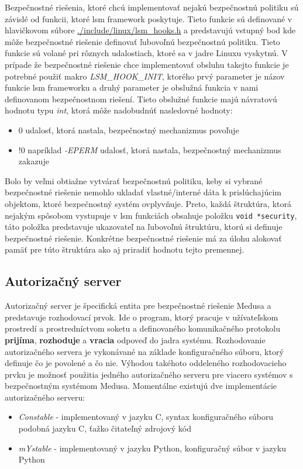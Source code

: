 Bezpečnostné riešenia, ktoré chcú implementovať nejakú bezpečnostnú politiku sú závislé od funkcii, ktoré \acrshort{lsm} framework poskytuje. Tieto funkcie sú definované v hlavičkovom súbore \url{./include/linux/lsm_hooks.h} a predstavujú vstupný bod kde môže bezpečnostné riešenie definovať ľubovoľnú bezpečnostnú politiku. Tieto funkcie sú volané pri rôznych udalostiach, ktoré sa v jadre Linuxu vyskytnú. V prípade že bezpečnostné riešenie chce implementovať obsluhu takejto funkcie je potrebné použiť makro \textit{LSM\_HOOK\_INIT}, ktorého prvý parameter je názov funkcie \acrshort{lsm} frameworku a druhý parameter je obslužná funkcia v nami definovanom bezpečnostnom riešení.\cite{medusavilo} Tieto obslužné funkcie majú návratovú hodnotu typu \textit{int}, ktorá môže nadobudnúť nasledovné hodnoty:
\begin{itemize}
\item 0 udalosť, ktorá nastala, bezpečnostný mechanizmus povoľuje
\item !0 napríklad \textit{-EPERM} udalosť, ktorá nastala, bezpečnostný mechanizmus zakazuje
\end{itemize}

Bolo by veľmi obtiažne vytvárať bezpečnostnú politiku, keby si vybrané bezpečnostné riešenie nemohlo ukladať vlastné/interné dáta k prislúchajúcim objektom, ktoré bezpečnostný systém ovplyvňuje. Preto, každá štruktúra, ktorá nejakým spôsobom vystupuje v \acrshort{lsm} funkciách obsahuje položku \texttt{void *security}, táto položka predstavuje ukazovateľ na ľubovoľnú štruktúru, ktorú si definuje bezpečnostné riešenie. Konkrétne bezpečnostné riešenie má za úlohu alokovať pamäť pre túto štruktúra ako aj priradiť hodnotu tejto premennej.
\subsection{Autorizačný server}
Autorizačný server je špecifická entita pre bezpečnostné riešenie Medusa a predstavuje rozhodovací prvok. Ide o program, ktorý pracuje v užívateľskom prostredí a prostredníctvom soketu a definovaného komunikačného protokolu \textbf{prijíma}, \textbf{rozhoduje} a \textbf{vracia} odpoveď do jadra systému. Rozhodovanie autorizačného servera je vykonávané na základe konfiguračného súboru, ktorý definuje čo je povolené a čo nie. Výhodou takéhoto oddeleného rozhodovacieho prvku je možnosť použitia jedného autorizačného serveru pre viacero systémov s bezpečnostným systémom Medusa. Momentálne existujú dve implementácie autorizačného serveru:
\begin{itemize}
\item \textit{Constable} - implementovaný v jazyku C, syntax konfiguračného súboru podobná jazyku C, ťažko čitateľný zdrojový kód 
\item \textit{mYstable} - implementovaný v jazyku Python, konfiguračný súbor v jazyku Python
\end{itemize}

